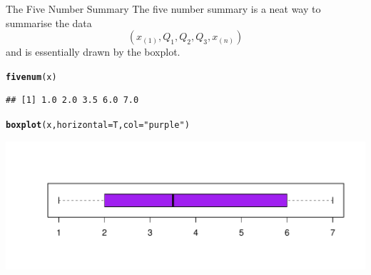 \documentclass[t,xcolor=pdftex,dvipsnames,table]{beamer}\usepackage[]{graphicx}\usepackage[]{color}
\makeatletter
\def\maxwidth{ %
  \ifdim\Gin@nat@width>\linewidth
    \linewidth
  \else
    \Gin@nat@width
  \fi
}
\newcommand{\hlstr}[1]{\textcolor[rgb]{0.192,0.494,0.8}{#1}}%
\newcommand{\hlstd}[1]{\textcolor[rgb]{0.345,0.345,0.345}{#1}}%
\newcommand{\hlkwc}[1]{\textcolor[rgb]{0.333,0.667,0.333}{#1}}%
\newcommand{\hlkwd}[1]{\textcolor[rgb]{0.737,0.353,0.396}{\textbf{#1}}}%
\newenvironment{kframe}{%
 \def\at@end@of@kframe{}%
 \ifinner\ifhmode%
  \def\at@end@of@kframe{\end{minipage}}%
  \begin{minipage}{\columnwidth}%
 \fi\fi%
 \def\FrameCommand##1{\hskip\@totalleftmargin \hskip-\fboxsep
 \colorbox{shadecolor}{##1}\hskip-\fboxsep
     \hskip-\linewidth \hskip-\@totalleftmargin \hskip\columnwidth}%
 \MakeFramed {\advance\hsize-\width
   \@totalleftmargin\z@ \linewidth\hsize
   \@setminipage}}%
 {\par\unskip\endMakeFramed%
 \at@end@of@kframe}
\newenvironment{knitrout}{}{} %
\makeatother
\begin{document}
\begin{frame}[fragile]{The Five Number Summary}
The five number summary is a neat way to summarise the data
\[ ( x_{(1)}, Q_{1}, Q_{2}, Q_{3}, x_{(n)} ) \]
and is essentially drawn by the boxplot.

\begin{knitrout}
\color{fgcolor}\begin{kframe}
\begin{alltt}
\hlkwd{fivenum}\hlstd{(x)}
\end{alltt}
\begin{verbatim}
## [1] 1.0 2.0 3.5 6.0 7.0
\end{verbatim}
\begin{alltt}
\hlkwd{boxplot}\hlstd{(x,} \hlkwc{horizontal}\hlstd{=T,} \hlkwc{col}\hlstd{=}\hlstr{"purple"}\hlstd{)}
\end{alltt}
\end{kframe}
\includegraphics[width=\maxwidth]{figure/unnamed-chunk-37-1} 

\end{knitrout}
\end{frame}
\end{document}
